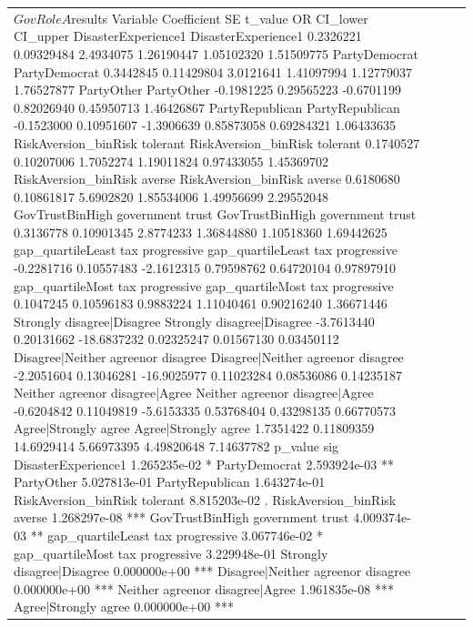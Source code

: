 \begin{table}[!h]
\begin{tabular}[t]{>{\raggedright\arraybackslash}p{6.4cm}ccc}
$GovRoleA$results
                                                             Variable Coefficient         SE     t_value         OR   CI_lower   CI_upper
DisasterExperience1                               DisasterExperience1   0.2326221 0.09329484   2.4934075 1.26190447 1.05102320 1.51509775
PartyDemocrat                                           PartyDemocrat   0.3442845 0.11429804   3.0121641 1.41097994 1.12779037 1.76527877
PartyOther                                                 PartyOther  -0.1981225 0.29565223  -0.6701199 0.82026940 0.45950713 1.46426867
PartyRepublican                                       PartyRepublican  -0.1523000 0.10951607  -1.3906639 0.85873058 0.69284321 1.06433635
RiskAversion_binRisk tolerant           RiskAversion_binRisk tolerant   0.1740527 0.10207006   1.7052274 1.19011824 0.97433055 1.45369702
RiskAversion_binRisk averse               RiskAversion_binRisk averse   0.6180680 0.10861817   5.6902820 1.85534006 1.49956699 2.29552048
GovTrustBinHigh government trust     GovTrustBinHigh government trust   0.3136778 0.10901345   2.8774233 1.36844880 1.10518360 1.69442625
gap_quartileLeast tax progressive   gap_quartileLeast tax progressive  -0.2281716 0.10557483  -2.1612315 0.79598762 0.64720104 0.97897910
gap_quartileMost tax progressive     gap_quartileMost tax progressive   0.1047245 0.10596183   0.9883224 1.11040461 0.90216240 1.36671446
Strongly disagree|Disagree                 Strongly disagree|Disagree  -3.7613440 0.20131662 -18.6837232 0.02325247 0.01567130 0.03450112
Disagree|Neither agreenor disagree Disagree|Neither agreenor disagree  -2.2051604 0.13046281 -16.9025977 0.11023284 0.08536086 0.14235187
Neither agreenor disagree|Agree       Neither agreenor disagree|Agree  -0.6204842 0.11049819  -5.6153335 0.53768404 0.43298135 0.66770573
Agree|Strongly agree                             Agree|Strongly agree   1.7351422 0.11809359  14.6929414 5.66973395 4.49820648 7.14637782
                                        p_value sig
DisasterExperience1                1.265235e-02   *
PartyDemocrat                      2.593924e-03  **
PartyOther                         5.027813e-01    
PartyRepublican                    1.643274e-01    
RiskAversion_binRisk tolerant      8.815203e-02   .
RiskAversion_binRisk averse        1.268297e-08 ***
GovTrustBinHigh government trust   4.009374e-03  **
gap_quartileLeast tax progressive  3.067746e-02   *
gap_quartileMost tax progressive   3.229948e-01    
Strongly disagree|Disagree         0.000000e+00 ***
Disagree|Neither agreenor disagree 0.000000e+00 ***
Neither agreenor disagree|Agree    1.961835e-08 ***
Agree|Strongly agree               0.000000e+00 ***



\end{tabular}
\end{table}
